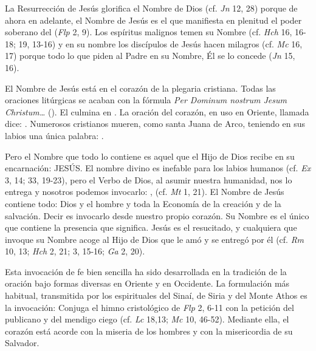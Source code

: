 	 La Resurrección de Jesús glorifica el Nombre de Dios  (cf. \emph{Jn} 12, 28) porque de ahora en adelante, el Nombre de Jesús es el que manifiesta en plenitud el poder soberano del  (\emph{Flp} 2, 9). Los espíritus malignos temen su Nombre (cf. \emph{Hch} 16, 16-18; 19, 13-16) y en su nombre los discípulos de Jesús hacen milagros (cf. \emph{Mc} 16, 17) porque todo lo que piden al Padre en su Nombre, Él se lo concede (\emph{Jn} 15, 16).
	
	 El Nombre de Jesús está en el corazón de la plegaria cristiana. Todas las oraciones litúrgicas se acaban con la fórmula \emph{Per Dominum nostrum Jesum Christum\ldots{}} (). El  culmina en . La oración del corazón, en uso en Oriente, llamada  dice: . Numerosos cristianos mueren, como santa Juana de Arco, teniendo en sus labios una única palabra: .
	
	 Pero el Nombre que todo lo contiene es aquel que el Hijo de Dios recibe en su encarnación: JESÚS. El nombre divino es inefable para los labios humanos (cf. \emph{Ex} 3, 14; 33, 19-23), pero el Verbo de Dios, al asumir nuestra humanidad, nos lo entrega y nosotros podemos invocarlo: ,  (cf. \emph{Mt} 1, 21). El Nombre de Jesús contiene todo: Dios y el hombre y toda la Economía de la creación y de la salvación. Decir  es invocarlo desde nuestro propio corazón. Su Nombre es el único que contiene la presencia que significa. Jesús es el resucitado, y cualquiera que invoque su Nombre acoge al Hijo de Dios que le amó y se entregó por él (cf. \emph{Rm} 10, 13; \emph{Hch} 2, 21; 3, 15-16; \emph{Ga} 2, 20).
	
	 Esta invocación de fe bien sencilla ha sido desarrollada en la tradición de la oración bajo formas diversas en Oriente y en Occidente. La formulación más habitual, transmitida por los espirituales del Sinaí, de Siria y del Monte Athos es la invocación:  Conjuga el himno cristológico de \emph{Flp} 2, 6-11 con la petición del publicano y del mendigo ciego (cf. \emph{Lc} 18,13; \emph{Mc} 10, 46-52). Mediante ella, el corazón está acorde con la miseria de los hombres y con la misericordia de su Salvador.
	
